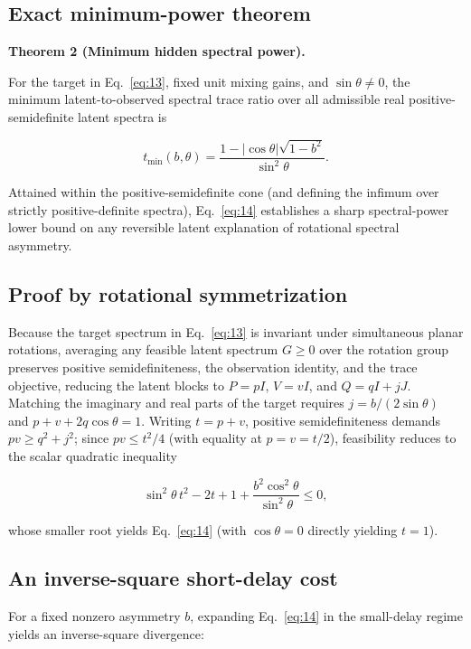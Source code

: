\documentclass[aps,pre,reprint,amsmath,amssymb,superscriptaddress]{revtex4-2}
\begin{document}
\subsection{Exact minimum-power theorem}

\textbf{Theorem 2 (Minimum hidden spectral power).}

For the target in Eq.~\eqref{eq:13}, fixed unit mixing gains, and \(\sin\theta\ne0\), the minimum latent-to-observed spectral trace ratio over all admissible real positive-semidefinite latent spectra is

\begin{equation}\label{eq:14}
\boxed{
t_{\min}(b,\theta)
=
\frac{
1-|\cos\theta|\sqrt{1-b^2}
}{
\sin^2\theta
}.
}
\end{equation}

Attained within the positive-semidefinite cone (and defining the infimum over strictly positive-definite spectra), Eq.~\eqref{eq:14} establishes a sharp spectral-power lower bound on any reversible latent explanation of rotational spectral asymmetry.

\subsection{Proof by rotational symmetrization}

Because the target spectrum in Eq.~\eqref{eq:13} is invariant under simultaneous planar rotations, averaging any feasible latent spectrum $G \ge 0$ over the rotation group preserves positive semidefiniteness, the observation identity, and the trace objective, reducing the latent blocks to $P = pI$, $V = vI$, and $Q = qI + jJ$. Matching the imaginary and real parts of the target requires $j = b / (2\sin\theta)$ and $p + v + 2q\cos\theta = 1$. Writing $t = p + v$, positive semidefiniteness demands $pv \ge q^2 + j^2$; since $pv \le t^2/4$ (with equality at $p = v = t/2$), feasibility reduces to the scalar quadratic inequality

\[
\sin^2\theta\, t^2 - 2t + 1 + \frac{b^2\cos^2\theta}{\sin^2\theta} \le 0,
\]



whose smaller root yields Eq.~\eqref{eq:14} (with $\cos\theta = 0$ directly yielding $t = 1$).

\subsection{An inverse-square short-delay cost}

For a fixed nonzero asymmetry $b$, expanding Eq.~\eqref{eq:14} in the small-delay regime yields an inverse-square divergence:
\end{document}
